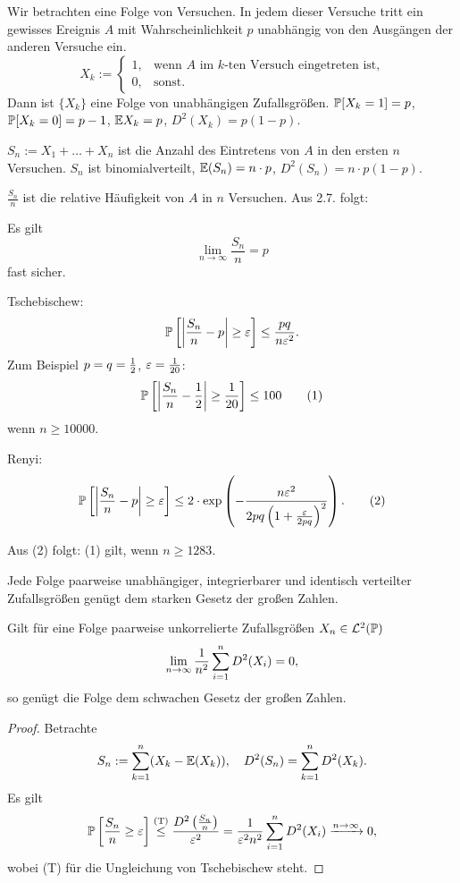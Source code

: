 \begin{exmp}
  Wir betrachten eine Folge von Versuchen. In jedem dieser Versuche tritt ein
  gewisses Ereignis $A$ mit Wahrscheinlichkeit $p$ unabhängig von den Ausgängen
  der anderen Versuche ein.
  \[ X_k := \begin{cases} 1,
      & \text{wenn $A$ im $k$-ten Versuch eingetreten  ist,}
      \\ 0, & \text{sonst.}
    \end{cases} \]
  Dann ist $\{ X_k \}$ eine Folge von unabhängigen Zufallsgrößen. $\mathbb{P}[X_k =
  1] = p$, $\mathbb{P}[X_k = 0] = p - 1$, $\mathbb{E} X_k = p$, $D^2(X_k) = p(1-p)$.

  $S_n := X_1 + \ldots + X_n$ ist die Anzahl des Eintretens von $A$ in den
  ersten $n$ Versuchen. $S_n$ ist binomialverteilt, $\mathbb{E}(S_n) = n \cdot p$, $D^2
  (S_n) = n \cdot p(1-p)$.

  $\frac{S_n}{n}$ ist die relative Häufigkeit von $A$ in $n$ Versuchen. Aus 2.7.
  folgt:
\end{exmp}

\begin{thm}[Borel]
  Es gilt
  \[ \lim_{n \to \infty} \frac{S_n}{n} = p \]
  fast sicher.
\end{thm}

\begin{rmrk*}
  Tschebischew:
  \[ \mathbb{P} \left[ \left| \frac{S_n}{n} - p \right| \ge \varepsilon \right] \le
    \frac{pq}{n \varepsilon^2}. \]
  Zum Beispiel $p = q = \frac{1}{2}$, $\varepsilon = \frac{1}{20}$:
  \[ \mathbb{P} \left[ \left| \frac{S_n}{n} - \frac{1}{2} \right| \ge \frac{1}{20} \right] \le
    100 \tag{1} \]
  wenn $n \ge 10000$.

  Renyi:
  \[ \mathbb{P} \left[ \left| \frac{S_n}{n} - p \right| \ge \varepsilon \right] \le 2 \cdot
    \exp \left( - \frac{n \varepsilon^2}{2 pq \left(1 + \frac{\varepsilon}{2pq} \right)^2} \right).
    \tag{2} \]

  Aus (2) folgt: (1) gilt, wenn $n \ge 1283$.
\end{rmrk*}

\begin{thm}[Etemadi]
  Jede Folge paarweise unabhängiger, integrierbarer und identisch verteilter
  Zufallsgrößen genügt dem starken Gesetz der großen Zahlen.
\end{thm}

\clearpage

\begin{thm}[Khinchin]
  Gilt für eine Folge paarweise unkorrelierte Zufallsgrößen $X_n \in
  \mathcal{L}^2(\mathbb{P})$
  \[ \lim_{n \to \infty} \frac{1}{n^2} \sum_{i=1}^n D^2(X_i) = 0, \]
  so genügt die Folge dem schwachen Gesetz der großen Zahlen.
\end{thm}

\begin{proof}
  Betrachte
  \[ S_n := \sum_{k=1}^n (X_k - \mathbb{E}(X_k)), \quad D^2(S_n) = \sum_{k=1}^n
    D^2(X_k). \]
  Es gilt
  \[ \mathbb{P} \left[ \frac{S_n}{n} \ge \varepsilon \right]
    \overset{\text{(T)}} \le \frac{D^2 \left(  \frac{S_n}{n} \right)}{\varepsilon^2}
    = \frac{1}{\varepsilon^2 n^2}  \sum_{i = 1}^n D^2(X_i) \xrightarrow{n \to \infty} 0, \]
  wobei (T) für die Ungleichung von Tschebischew steht.
\end{proof}